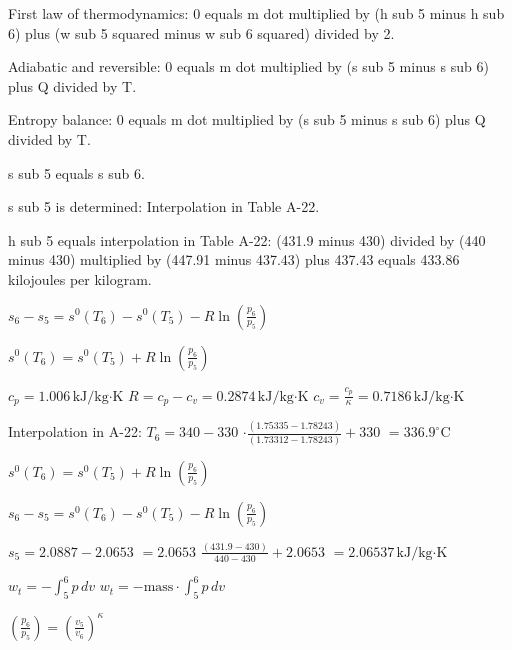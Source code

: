 First law of thermodynamics:  
0 equals m dot multiplied by (h sub 5 minus h sub 6) plus (w sub 5 squared minus w sub 6 squared) divided by 2.  

Adiabatic and reversible:  
0 equals m dot multiplied by (s sub 5 minus s sub 6) plus Q divided by T.  

Entropy balance:  
0 equals m dot multiplied by (s sub 5 minus s sub 6) plus Q divided by T.  

s sub 5 equals s sub 6.  

s sub 5 is determined:  
Interpolation in Table A-22.  

h sub 5 equals interpolation in Table A-22:  
(431.9 minus 430) divided by (440 minus 430) multiplied by (447.91 minus 437.43) plus 437.43 equals 433.86 kilojoules per kilogram.

\( s_6 - s_5 = s^0(T_6) - s^0(T_5) - R \ln \left( \frac{p_6}{p_5} \right) \)  

\( s^0(T_6) = s^0(T_5) + R \ln \left( \frac{p_6}{p_5} \right) \)  

\( c_p = 1.006 \, \text{kJ/kg·K} \)  
\( R = c_p - c_v = 0.2874 \, \text{kJ/kg·K} \)  
\( c_v = \frac{c_p}{\kappa} = 0.7186 \, \text{kJ/kg·K} \)  

Interpolation in A-22:  
\( T_6 = 340 - 330 \)  
\( \cdot \frac{(1.75335 - 1.78243)}{(1.73312 - 1.78243)} + 330 \)  
\( = 336.9^\circ \text{C} \)  

\( s^0(T_6) = s^0(T_5) + R \ln \left( \frac{p_6}{p_5} \right) \)  

\( s_6 - s_5 = s^0(T_6) - s^0(T_5) - R \ln \left( \frac{p_6}{p_5} \right) \)  

\( s_5 = 2.0887 - 2.0653 \)  
\( = 2.0653 \)  
\( \frac{(431.9 - 430)}{440 - 430} + 2.0653 \)  
\( = 2.06537 \, \text{kJ/kg·K} \)  

\( w_t = - \int_5^6 p \, dv \)  
\( w_t = - \text{mass} \cdot \int_5^6 p \, dv \)  

\( \left( \frac{p_6}{p_5} \right) = \left( \frac{v_5}{v_6} \right)^\kappa \)